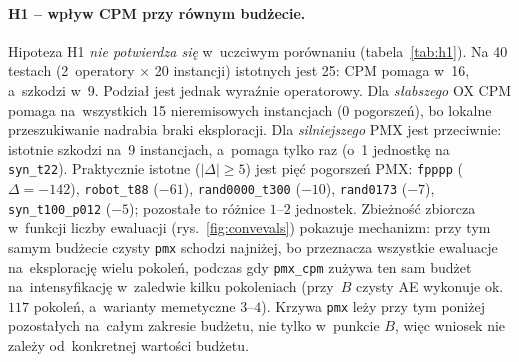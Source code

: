 \documentclass[pdflatex,sn-mathphys,Numbered]{sn-jnl}
\begin{document}
\paragraph{H1 -- wpływ CPM przy równym budżecie.}
Hipoteza H1 \emph{nie potwierdza się} w~uczciwym porównaniu (tabela~\ref{tab:h1}).
Na 40 testach (2~operatory $\times$ 20 instancji) istotnych jest 25: CPM pomaga
w~16, a~szkodzi w~9. Podział jest jednak wyraźnie operatorowy. Dla \emph{słabszego}
OX CPM pomaga na~wszystkich 15 nieremisowych instancjach (0 pogorszeń), bo lokalne
przeszukiwanie nadrabia braki eksploracji. Dla \emph{silniejszego} PMX jest
przeciwnie: istotnie szkodzi na~9 instancjach, a~pomaga tylko raz (o~1 jednostkę na
\texttt{syn\_t22}). Praktycznie istotne ($|\Delta|\ge 5$) jest pięć pogorszeń PMX:
\texttt{fpppp} ($\Delta=-142$), \texttt{robot\_t88} ($-61$),
\texttt{rand0000\_t300} ($-10$), \texttt{rand0173} ($-7$), \texttt{syn\_t100\_p012}
($-5$); pozostałe to różnice $1$--$2$ jednostek. Zbieżność zbiorcza w~funkcji
liczby ewaluacji (rys.~\ref{fig:convevals}) pokazuje mechanizm: przy tym samym
budżecie czysty \texttt{pmx} schodzi najniżej, bo przeznacza wszystkie ewaluacje
na~eksplorację wielu pokoleń, podczas gdy \texttt{pmx\_cpm} zużywa ten sam budżet
na~intensyfikację w~zaledwie kilku pokoleniach (przy~$B$ czysty AE wykonuje
ok.~$117$ pokoleń, a~warianty memetyczne $3$--$4$). Krzywa \texttt{pmx} leży przy tym poniżej
pozostałych na~całym zakresie budżetu, nie tylko w~punkcie $B$, więc wniosek nie
zależy od~konkretnej wartości budżetu.
\end{document}
